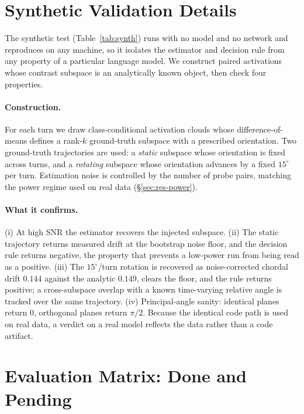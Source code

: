 \appendix

\section{Synthetic Validation Details}
\label{app:synth}

The synthetic test (Table~\ref{tab:synth}) runs with no model and no network and reproduces on
any machine, so it isolates the estimator and decision rule from any property of a particular
language model. We construct paired activations whose contrast subspace is an analytically
known object, then check four properties.

\paragraph{Construction.} For each turn we draw class-conditional activation clouds whose
difference-of-means defines a rank-$k$ ground-truth subspace with a prescribed orientation.
Two ground-truth trajectories are used: a \emph{static} subspace whose orientation is fixed
across turns, and a \emph{rotating} subspace whose orientation advances by a fixed
$15^\circ$ per turn. Estimation noise is controlled by the number of probe pairs, matching the
power regime used on real data (\S\ref{sec:res-power}).

\paragraph{What it confirms.} (i) At high SNR the estimator recovers the injected subspace.
(ii) The static trajectory returns measured drift at the bootstrap noise floor, and the
decision rule returns negative, the property that prevents a low-power run from being read as a
positive. (iii) The $15^\circ$/turn rotation is recovered as noise-corrected chordal drift
$0.144$ against the analytic $0.149$, clears the floor, and the rule
returns positive; a cross-subspace overlap with a known time-varying relative angle is tracked
over the same trajectory. (iv) Principal-angle sanity: identical planes return $0$, orthogonal
planes return $\pi/2$. Because the identical code path is used on real data, a verdict on a real
model reflects the data rather than a code artifact.

\section{Evaluation Matrix: Done and Pending}
\label{app:matrix}

